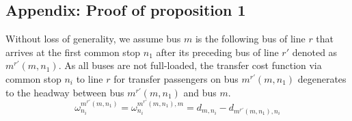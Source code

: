 \documentclass[smallextended]{svjour3}       %
\begin{document}
\begin{Abstract}
\section*{Appendix: Proof of proposition 1}
\appendix
Without loss of generality, we assume bus $m$ is the following bus of line $r$ that arrives at the first common stop $n_{1}$ after its preceding bus of line $r'$ denoted as $m^{r'}(m,n_{1})$.
As all buses are not full-loaded, the transfer cost function via common stop $n_{i}$ to line $r$ for transfer passengers on bus $m^{r'}\left(m,n_{1}\right)$ 
degenerates to the headway between bus $m^{r'}\left(m,n_{1}\right)$ and bus $m$.
\begin{equation}
    \omega_{n_i}^{m^{r'}\left(m,n_{1}\right)} = \omega_{n_i}^{m^{r'}\left(m,n_{1}\right),m} 
    = d_{m,n_{i}}-d_{m^{r'}\left(m,n_{1}\right),n_{i}}
    \end{equation}



\end{Abstract}
\end{document}
